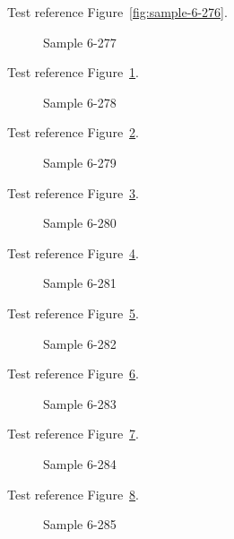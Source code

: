 Test reference Figure~\ref{fig:sample-6-276}.

\begin{figure}[tbhp]
\caption{Sample 6-277}
\label{fig:sample-6-277}
\end{figure}

Test reference Figure~\ref{fig:sample-6-277}.

\begin{figure}[tbhp]
\caption{Sample 6-278}
\label{fig:sample-6-278}
\end{figure}

Test reference Figure~\ref{fig:sample-6-278}.

\begin{figure}[tbhp]
\caption{Sample 6-279}
\label{fig:sample-6-279}
\end{figure}

Test reference Figure~\ref{fig:sample-6-279}.

\begin{figure}[tbhp]
\caption{Sample 6-280}
\label{fig:sample-6-280}
\end{figure}

Test reference Figure~\ref{fig:sample-6-280}.

\begin{figure}[tbhp]
\caption{Sample 6-281}
\label{fig:sample-6-281}
\end{figure}

Test reference Figure~\ref{fig:sample-6-281}.

\begin{figure}[tbhp]
\caption{Sample 6-282}
\label{fig:sample-6-282}
\end{figure}

Test reference Figure~\ref{fig:sample-6-282}.

\begin{figure}[tbhp]
\caption{Sample 6-283}
\label{fig:sample-6-283}
\end{figure}

Test reference Figure~\ref{fig:sample-6-283}.

\begin{figure}[tbhp]
\caption{Sample 6-284}
\label{fig:sample-6-284}
\end{figure}

Test reference Figure~\ref{fig:sample-6-284}.

\begin{figure}[tbhp]
\caption{Sample 6-285}
\label{fig:sample-6-285}
\end{figure}

